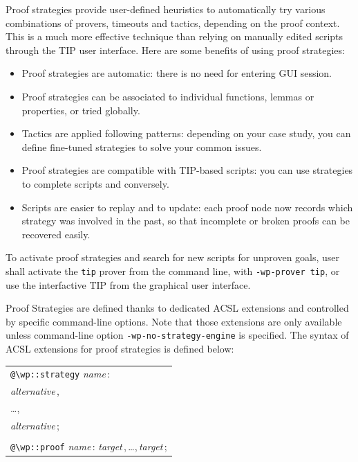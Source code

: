 Proof strategies provide user-defined heuristics to automatically try various
combinations of provers, timeouts and tactics, depending on the proof
context. This is a much more effective technique than relying on manually edited
scripts through the \textsf{TIP} user interface. Here are some benefits of using
proof strategies:
\begin{itemize}
\item Proof strategies are automatic: there is no need for entering GUI session.
\item Proof strategies can be associated to individual functions, lemmas or properties,
  or tried globally.
\item Tactics are applied following patterns: depending on your case study, you can
  define fine-tuned strategies to solve your common issues.
\item Proof strategies are compatible with TIP-based scripts: you can use
  strategies to complete scripts and conversely.
\item Scripts are easier to replay and to update: each proof node now records
  which strategy was involved in the past, so that incomplete or broken proofs
  can be recovered easily.
\end{itemize}

To activate proof strategies and search for new scripts for unproven goals, user
shall activate the \verb+tip+ prover from the command line, with
\verb+-wp-prover tip+, or use the interfactive \textsf{TIP} from the graphical
user interface.

Proof Strategies are defined thanks to dedicated ACSL extensions and controlled
by specific command-line options. Note that those extensions are only available
unless command-line option \verb+-wp-no-strategy-engine+ is specified.
The syntax of ACSL extensions for proof strategies is defined below:

\newcommand{\pdots}{\,,\,\ldots,\,}

\begin{center}
  \begin{tabular}{l}
    \verb+@\wp::strategy+ \textit{name}\,: \\
    \quad\quad\textit{alternative}\,, \\
    \quad\quad\ldots, \\
    \quad\quad\textit{alternative}\,; \\
    \\
    \verb+@\wp::proof+ \textit{name}\,: \textit{target}\pdots\textit{target}\,;
  \end{tabular}
\end{center}

